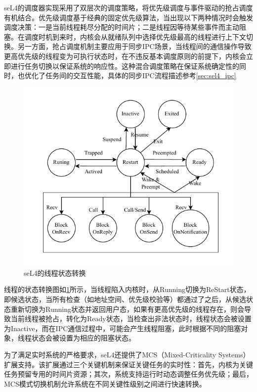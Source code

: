 seL4的调度器实现采用了双层次的调度策略，将优先级调度与事件驱动的抢占调度有机结合。优先级调度基于经典的固定优先级算法，当出现以下两种情况时会触发调度决策：一是当前线程耗尽分配的时间片；二是线程因等待某些事件而主动阻塞。在调度时机到来时，内核会从就绪队列中选择优先级最高的线程进行上下文切换。另一方面，抢占调度机制主要应用于同步IPC场景，当线程间的通信操作导致更高优先级的线程变为可执行状态时，在不违反基本调度原则的前提下，内核会立即进行任务切换以保证系统的响应性。这种混合调度策略在保证系统确定性的同时，也优化了任务间的交互性能，具体的同步IPC流程描述参考\ref{sec:sel4_ipc}

\begin{figure}[htbp]
  \centering
  \includegraphics{figures/seL4_thread_state.drawio.pdf}
  \caption{seL4的线程状态转换}\label{fig:seL4_thread_state}
\end{figure}

线程的状态转换图如\ref{fig:seL4_thread_state}所示，当线程陷入内核时，从Running切换为ReStart状态，即候选状态，当所有检查（如地址空间、优先级校验等）都通过了之后，从候选状态重新切换为Running状态并返回用户态，如果有更高优先级的线程存在，则会导致当前线程被抢占，转化为Ready状态，当检查出非法状态时，线程状态会被设置为Inactive，而在IPC通信过程中，可能会产生线程阻塞，此时根据不同的阻塞对象，线程状态会被设置为相应的阻塞状态。


为了满足实时系统的严格要求，seL4还提供了MCS（Mixed-Criticality Systems）扩展支持。该扩展通过三个关键机制来保证关键任务的实时性：首先，内核为关键任务预留专用的时间片资源；其次，系统支持运行时动态调整任务优先级；最后，MCS模式切换机制允许系统在不同关键性级别之间进行快速转换。

